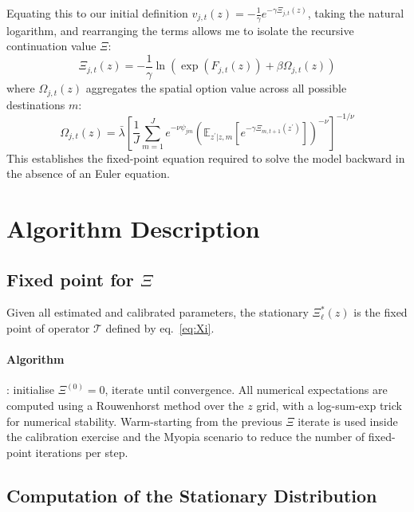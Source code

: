 \documentclass[12pt, a4paper]{article}
\begin{document}
Equating this to our initial definition $v_{j,t}(z) = -\frac{1}{\gamma} e^{-\gamma \Xi_{j,t}(z)}$, taking the natural logarithm, and rearranging the terms allows me to isolate the recursive continuation value $\Xi$:
\begin{equation}
\Xi_{j,t}(z) = -\frac{1}{\gamma} \ln \left( \exp\left(F_{j,t}(z)\right) + \beta \Omega_{j,t}(z) \right)
\end{equation}
where $\Omega_{j,t}(z)$ aggregates the spatial option value across all possible destinations $m$:
\begin{equation}
\Omega_{j,t}(z) = \bar{\lambda} \left[ \frac{1}{J} \sum_{m=1}^J e^{-\nu \psi_{j m}} \left( \mathbb{E}_{z^\prime|z, m} \left[ e^{-\gamma \Xi_{m,t+1}(z^\prime)} \right] \right)^{-\nu} \right]^{-1/\nu}
\end{equation}
This establishes the fixed-point equation required to solve the model backward in the absence of an Euler equation.

\section{Algorithm Description}
\label{app:algorithms}
\subsection{Fixed point for $\Xi$}
Given all estimated and calibrated parameters, the stationary $\Xi^*_\ell(z)$
is the fixed point of operator $\mathcal{T}$ defined by eq.~\eqref{eq:Xi}.
\paragraph{Algorithm}: initialise $\Xi^{(0)} = 0$, iterate until convergence. All numerical expectations are computed using a Rouwenhorst method over the $z$ grid, with a log-sum-exp trick for numerical stability. Warm-starting from the previous $\Xi$ iterate is used inside the calibration exercise and the Myopia scenario to reduce the number of fixed-point iterations per step. 



\subsection{Computation of the Stationary Distribution}
\end{document}
